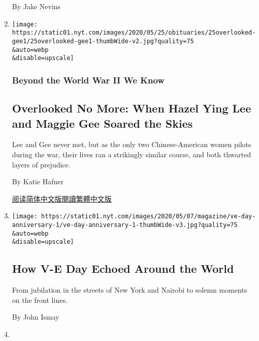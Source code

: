 \begin{enumerate}
  By Jake Nevins
\item
  \href{/2020/05/21/obituaries/hazel-ying-lee-and-maggie-gee-overlooked.html}{}

  \texttt{[image: https://static01.nyt.com/images/2020/05/25/obituaries/25overlooked-gee1/25overlooked-gee1-thumbWide-v2.jpg?quality=75\\\&auto=webp\\\&disable=upscale]}

  \hypertarget{beyond-the-world-war-ii-we-know-10}{%
  \subsubsection{Beyond the World War II We
  Know}\label{beyond-the-world-war-ii-we-know-10}}

  \hypertarget{overlooked-no-more-when-hazel-ying-lee-and-maggie-gee-soared-the-skies}{%
  \subsection{Overlooked No More: When Hazel Ying Lee and Maggie Gee
  Soared the
  Skies}\label{overlooked-no-more-when-hazel-ying-lee-and-maggie-gee-soared-the-skies}}

  Lee and Gee never met, but as the only two Chinese-American women
  pilots during the war, their lives ran a strikingly similar course,
  and both thwarted layers of prejudice.

  By Katie Hafner

  \href{https://cn.nytimes.com/obits/20200526/hazel-ying-lee-and-maggie-gee-overlooked/}{阅读简体中文版}\href{https://cn.nytimes.com/obits/20200526/hazel-ying-lee-and-maggie-gee-overlooked/zh-}{閱讀繁體中文版}
\item
  \href{/interactive/2020/05/07/magazine/ve-day-anniversary.html}{}

  \texttt{[image: https://static01.nyt.com/images/2020/05/07/magazine/ve-day-anniversary-1/ve-day-anniversary-1-thumbWide-v3.jpg?quality=75\\\&auto=webp\\\&disable=upscale]}

  \hypertarget{how-v-e-day-echoed-around-the-world}{%
  \subsection{How V-E Day Echoed Around the
  World}\label{how-v-e-day-echoed-around-the-world}}

  From jubilation in the streets of New York and Nairobi to solemn
  moments on the front lines.

  By John Ismay
\item
  \href{/2020/05/04/nyregion/holocaust-survivors-coronavirus.html}{}


\end{enumerate}
